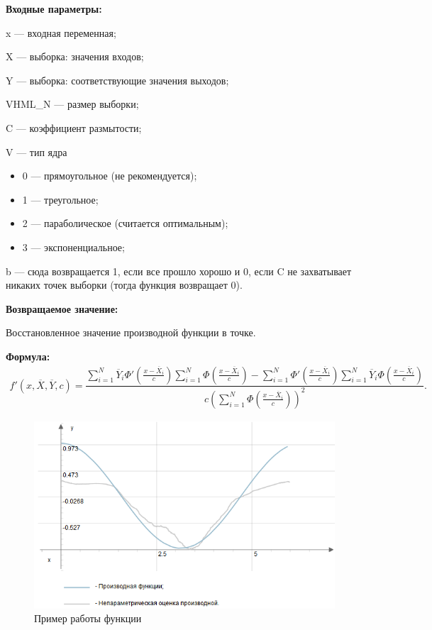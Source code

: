 \textbf{Входные параметры:} 
 
x --- входная переменная;
 
X --- выборка: значения входов;
 
Y --- выборка: соответствующие значения выходов;
 
VHML\_N --- размер выборки;
 
C --- коэффициент размытости;
 
V --- тип ядра
 
 \begin{itemize}
 \item  0 --- прямоугольное (не рекомендуется);
 \item  1 --- треугольное;
 \item  2 --- параболическое (считается оптимальным);
 \item  3 --- экспоненциальное;
 \end{itemize}
 
b --- сюда возвращается 1, если все прошло хорошо и 0, если C не захватывает никаких точек выборки (тогда функция возвращает 0).

\textbf{Возвращаемое значение:}
 
 Восстановленное значение производной функции в точке.

\textbf{Формула:}
\begin{eqnarray*}
{f}'\left( x, \overline{X},\overline{Y}, c\right) =\dfrac{\sum_{i=1}^{N}\overline{Y}_i{\Phi}'\left( \frac{x-\overline{X}_i}{c}\right) \sum_{i=1}^{N}\Phi\left( \frac{x-\overline{X}_i}{c}\right)-\sum_{i=1}^{N}{\Phi}'\left( \frac{x-\overline{X}_i}{c}\right) \sum_{i=1}^{N}\overline{Y}_i\Phi\left( \frac{x-\overline{X}_i}{c}\right)}{c\left( \sum_{i=1}^{N}\Phi\left( \frac{x-\overline{X}_i}{c}\right)\right)^2 }.
\end{eqnarray*}

 \begin{figure} [h] 
   \center
   \includegraphics {HML_NonparametricEstimatorOfDerivative.png}
   \caption{Пример работы функции} 
   \label{img:HML_NonparametricEstimatorOfDerivative}  
 \end{figure}